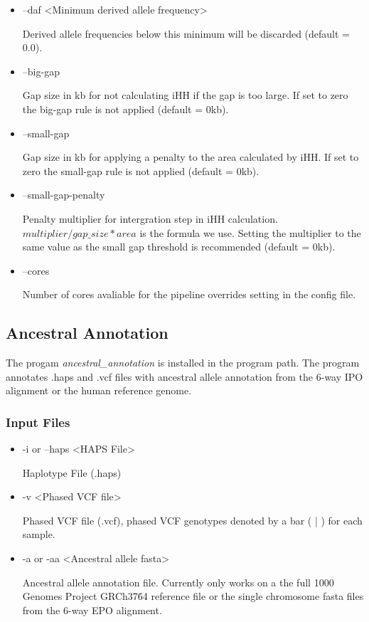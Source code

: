 \documentclass[a4paper,10pt]{article}
\begin{document}
\begin{itemize}
\item --daf <Minimum derived allele frequency>

Derived allele frequencies below this minimum will be discarded (default = 0.0).

\item --big-gap

Gap size in kb for not calculating iHH if the gap is too large. If set
to zero the big-gap rule is not applied (default = 0kb).

\item --small-gap

Gap size in kb for applying a penalty to the area calculated by
iHH. If set to zero the small-gap rule is not applied (default = 0kb).

\item --small-gap-penalty

Penalty multiplier for intergration step in iHH
calculation. $multiplier/gap\_size * area$ is the formula we
use. Setting the multiplier to the same value as the small gap
threshold is recommended (default = 0kb).

\item --cores 

Number of cores avaliable for the pipeline overrides setting in the config file. 

\end{itemize}
\subsection{Ancestral Annotation}
The progam \emph{ancestral\_annotation} is installed in the program
path. The program annotates .haps and .vcf files with ancestral allele
annotation from the 6-way IPO alignment or the human reference genome.
\subsubsection{Input Files}
\begin{itemize}
\item -i or --haps <HAPS File>

Haplotype File (.haps)

\item -v <Phased VCF file>

Phased VCF file (.vcf), phased VCF genotypes denoted by a bar ( | ) for each sample.
\item -a or -aa <Ancestral allele fasta>

Ancestral allele annotation file. Currently only works on a the full
1000 Genomes Project GRCh37\.64 reference file or the single chromosome fasta
files from the 6-way EPO alignment.

\end{itemize}
\end{document}
